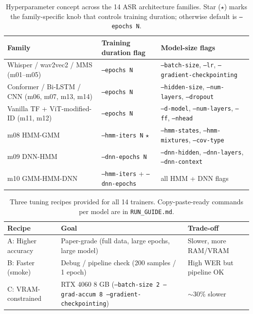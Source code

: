
\begin{table}[h]
  \centering
  \caption{Hyperparameter concept across the 14 ASR architecture families.
           Star ($\star$) marks the family-specific knob that controls
           training duration; otherwise default is \texttt{--epochs N}.}
  \label{tab:hyperparam_concept}
  \small
  \begin{tabular}{p{3.6cm}p{3.0cm}p{4.4cm}}
  \hline
  Family & Training duration flag & Model-size flags \\
  \hline
  Whisper / wav2vec2 / MMS (m01--m05) & \texttt{--epochs N} & \texttt{--batch-size}, \texttt{--lr}, \texttt{--gradient-checkpointing} \\
  Conformer / Bi-LSTM / CNN (m06, m07, m13, m14) & \texttt{--epochs N} & \texttt{--hidden-size}, \texttt{--num-layers}, \texttt{--dropout} \\
  Vanilla TF + ViT-modified-ID (m11, m12) & \texttt{--epochs N} & \texttt{--d-model}, \texttt{--num-layers}, \texttt{--ff}, \texttt{--nhead} \\
  m08 HMM-GMM & \texttt{--hmm-iters N} $\star$ & \texttt{--hmm-states}, \texttt{--hmm-mixtures}, \texttt{--cov-type} \\
  m09 DNN-HMM & \texttt{--dnn-epochs N} & \texttt{--dnn-hidden}, \texttt{--dnn-layers}, \texttt{--dnn-context} \\
  m10 GMM-HMM-DNN & \texttt{--hmm-iters} + \texttt{--dnn-epochs} & all HMM + DNN flags \\
  \hline
  \end{tabular}
\end{table}


\begin{table}[h]
  \centering
  \caption{Three tuning recipes provided for all 14 trainers.
           Copy-paste-ready commands per model are in \texttt{RUN\_GUIDE.md}.}
  \label{tab:tuning_recipes}
  \small
  \begin{tabular}{p{3.0cm}p{6.0cm}p{3.5cm}}
  \hline
  Recipe & Goal & Trade-off \\
  \hline
  A: Higher accuracy & Paper-grade (full data, large epochs, large model) & Slower, more RAM/VRAM \\
  B: Faster (smoke) & Debug / pipeline check (200 samples / 1 epoch) & High WER but pipeline OK \\
  C: VRAM-constrained & RTX 4060 8 GB (\texttt{--batch-size 2 --grad-accum 8 --gradient-checkpointing}) & $\sim$30\% slower \\
  \hline
  \end{tabular}
\end{table}
